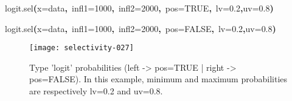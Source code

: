 \documentclass[letterpaper, 12pt]{article}
\newenvironment{Hinput}%
{}%
{}%
\newenvironment{Hchunk}%
{\vspace{0.5em}\par\begin{flushleft}}%
{\end{flushleft}}%
\newcommand{\hlnumber}[1]{\textcolor[rgb]{0.0823529411764706,0.0784313725490196,0.709803921568627}{#1}}%
\newcommand{\hlfunctioncall}[1]{\textcolor[rgb]{1,0,0}{#1}}%
\newcommand{\hlkeyword}[1]{\textcolor[rgb]{0,0,0}{\textbf{#1}}}%
\newcommand{\hlargument}[1]{\textcolor[rgb]{0.694117647058824,0.247058823529412,0.0196078431372549}{#1}}%
\newcommand{\hlsymbol}[1]{\textcolor[rgb]{0,0,0}{#1}}%
\newcommand{\hlprompt}[1]{\textcolor[rgb]{0,0,0}{#1}}%
\begin{document}
\begin{Hchunk}
\begin{normalsize}
\begin{Hinput}
\ttfamily\noindent
\hlprompt{\usebox{\hlnormalsizeboxgreaterthan}{\ }}\hlfunctioncall{logit.sel}\hlkeyword{(}\hlargument{x}\hlargument{=}\hlsymbol{data}\hlkeyword{,}{\ }\hlargument{infl1}\hlargument{=}\hlnumber{1000}\hlkeyword{,}{\ }\hlargument{infl2}\hlargument{=}\hlnumber{2000}\hlkeyword{,}{\ }\hlargument{pos}\hlargument{=}\hlnumber{TRUE}\hlkeyword{,}{\ }\hlargument{lv}\hlargument{=}\hlnumber{0.2}\hlkeyword{,}\hlargument{uv}\hlargument{=}\hlnumber{0.8}\hlkeyword{)}\mbox{}
\normalfont
\end{Hinput}


\begin{Hinput}
\ttfamily\noindent
\hlprompt{\usebox{\hlnormalsizeboxgreaterthan}{\ }}\hlfunctioncall{logit.sel}\hlkeyword{(}\hlargument{x}\hlargument{=}\hlsymbol{data}\hlkeyword{,}{\ }\hlargument{infl1}\hlargument{=}\hlnumber{1000}\hlkeyword{,}{\ }\hlargument{infl2}\hlargument{=}\hlnumber{2000}\hlkeyword{,}{\ }\hlargument{pos}\hlargument{=}\hlnumber{FALSE}\hlkeyword{,}{\ }\hlargument{lv}\hlargument{=}\hlnumber{0.2}\hlkeyword{,}\hlargument{uv}\hlargument{=}\hlnumber{0.8}\hlkeyword{)}\mbox{}
\normalfont
\end{Hinput}


\end{normalsize}
\end{Hchunk}


\begin{figure}[h]
\vspace{-20pt}
\begin{center}
\texttt{[image: selectivity-027]}
\end{center}
\vspace{-30pt}
\caption{Type 'logit' probabilities (left -> pos=TRUE |  right -> pos=FALSE). In this example, minimum and maximum probabilities are respectively lv=0.2 and uv=0.8.}
\vspace{-10pt}
\label{fig13}
\end{figure}

\newpage
\end{document}
